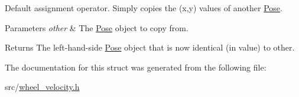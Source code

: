 Default assignment operator. Simply copies the (x,y) values of another \hyperlink{structPose}{Pose}. 


\begin{DoxyParams}{Parameters}
{\em other} & The \hyperlink{structPose}{Pose} object to copy from.\\
\hline
\end{DoxyParams}
\begin{DoxyReturn}{Returns}
The left-\/hand-\/side \hyperlink{structPose}{Pose} object that is now identical (in value) to {\ttfamily other}. 
\end{DoxyReturn}


The documentation for this struct was generated from the following file\+:\begin{DoxyCompactItemize}
\item 
src/\hyperlink{wheel__velocity_8h}{wheel\+\_\+velocity.\+h}\end{DoxyCompactItemize}
